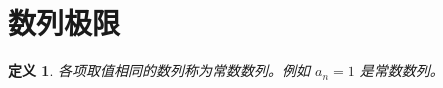 \documentclass{ctexart}
\newtheorem{definition}{定义}
\begin{document}
\section{数列极限}
\begin{definition}各项取值相同的数列称为常数数列。例如 $a_n=1$ 是常数数列。\end{definition}
\end{document}
